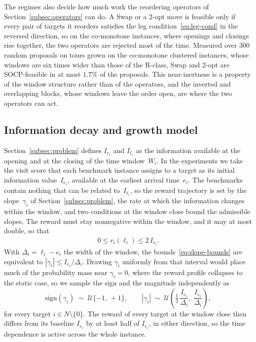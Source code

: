 The regimes also decide how much work the reordering operators of Section~\ref{subsec:operators} can do. A Swap or a 2-opt move is feasible only if every pair of targets it reorders satisfies the leg condition~\eqref{eq:leg-cond} in the reversed direction, so on the co-monotone instances, where openings and closings rise together, the two operators are rejected most of the time. Measured over $300$ random proposals on tours grown on the co-monotone clustered instances, whose windows are six times wider than those of the R-class, Swap and 2-opt are SOCP-feasible in at most $1.7\%$ of the proposals. This near-inertness is a property of the window structure rather than of the operators, and the inverted and overlapping blocks, whose windows leave the order open, are where the two operators can act.

\subsection{Information decay and growth model}\label{subsec:info-model}

Section~\ref{subsec:problem} defines $I_{e_i}$ and $I_{\ell_i}$ as the information available at the opening and at the closing of the time window~$W_i$. In the experiments we take the visit score that each benchmark instance assigns to a target as its initial information value~$I_{e_i}$, available at the earliest arrival time~$e_i$. The benchmarks contain nothing that can be related to~$I_{\ell_i}$, so the reward trajectory is set by the slope~$\gamma_i$ of Section~\ref{subsec:problem}, the rate at which the information changes within the window, and two conditions at the window close bound the admissible slopes. The reward must stay nonnegative within the window, and it may at most double, so that
\begin{align}
    0 \leq r_i(\ell_i) \leq 2\,I_{e_i}. \label{eq:slope-bounds}
\end{align}
With $\Delta_i = \ell_i - e_i$ the width of the window, the bounds~\eqref{eq:slope-bounds} are equivalent to $|\gamma_i| \le I_{e_i}/\Delta_i$. Drawing $\gamma_i$ uniformly from that interval would place much of the probability mass near $\gamma_i = 0$, where the reward profile collapses to the static case, so we sample the sign and the magnitude independently as
\begin{equation}\label{eq:gamma-sampling}
\mathrm{sign}(\gamma_i) \;\sim\; \mathcal{U}\{-1,\, +1\},
\qquad
|\gamma_i| \;\sim\; \mathcal{U}\!\left( \tfrac{1}{2}\,\frac{I_{e_i}}{\Delta_i},\; \frac{I_{e_i}}{\Delta_i} \right),
\end{equation}
for every target $i \in N \setminus \{0\}$. The reward of every target at the window close then differs from its baseline $I_{e_i}$ by at least half of $I_{e_i}$, in either direction, so the time dependence is active across the whole instance.

